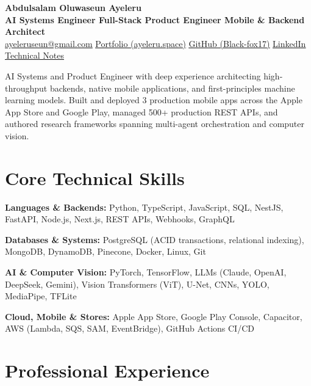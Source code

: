 \documentclass[10pt,letterpaper]{article}
\let\oldhref\href
\renewcommand{\href}[2]{\oldhref{#1}{\uline{#2}}}
\newcommand{\skillCategory}[2]{\textbf{#1:} #2\par\vspace{1pt}}
\begin{document}
\fontsize{8.6pt}{10.2pt}\selectfont
\color{textblack}

\begin{center}
  {\Large \bfseries Abdulsalam Oluwaseun Ayeleru}\\[2pt]
  {\small \textbf{AI Systems Engineer \textbar{} Full-Stack Product Engineer \textbar{} Mobile \& Backend Architect}}\\[2.5pt]
  \href{mailto:ayeleruseun@gmail.com}{ayeleruseun@gmail.com} \textbar{}
  \href{https://ayeleru.space}{Portfolio (ayeleru.space)} \textbar{}
  \href{https://github.com/Black-fox17}{GitHub (Black-fox17)} \textbar{}
  \href{https://www.linkedin.com/in/abdulsalam-ayeleru-77489a270/}{LinkedIn} \textbar{}
  \href{https://ayeleru.space/blog}{Technical Notes}
\end{center}

\vspace{-4pt}

AI Systems and Product Engineer with deep experience architecting high-throughput backends, native mobile applications, and first-principles machine learning models. Built and deployed 3 production mobile apps across the Apple App Store and Google Play, managed 500+ production REST APIs, and authored research frameworks spanning multi-agent orchestration and computer vision.

\section{Core Technical Skills}
\skillCategory{Languages \& Backends}{Python, TypeScript, JavaScript, SQL, NestJS, FastAPI, Node.js, Next.js, REST APIs, Webhooks, GraphQL}
\skillCategory{Databases \& Systems}{PostgreSQL (ACID transactions, relational indexing), MongoDB, DynamoDB, Pinecone, Docker, Linux, Git}
\skillCategory{AI \& Computer Vision}{PyTorch, TensorFlow, LLMs (Claude, OpenAI, DeepSeek, Gemini), Vision Transformers (ViT), U-Net, CNNs, YOLO, MediaPipe, TFLite}
\skillCategory{Cloud, Mobile \& Stores}{Apple App Store, Google Play Console, Capacitor, AWS (Lambda, SQS, SAM, EventBridge), GitHub Actions CI/CD}

\section{Professional Experience}
\end{document}
